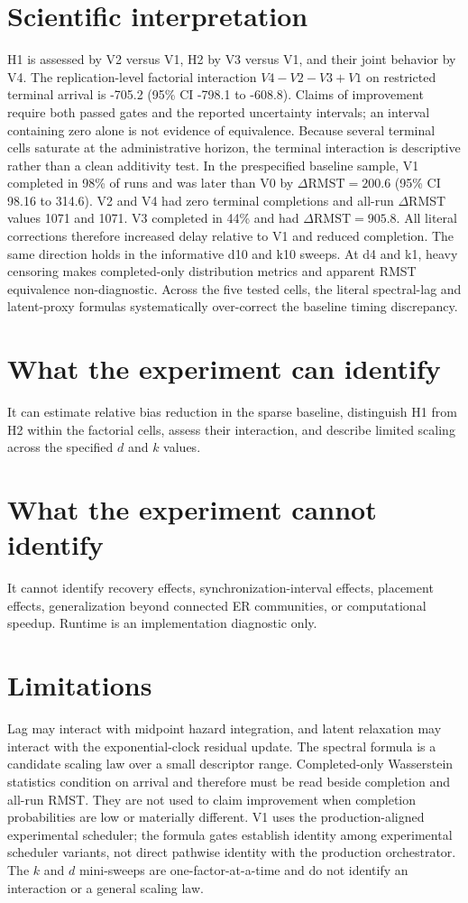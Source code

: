 \documentclass[11pt]{article}
\begin{document}
\section{Scientific interpretation}
H1 is assessed by V2 versus V1, H2 by V3 versus V1, and their joint behavior by
V4. The replication-level factorial interaction $V4-V2-V3+V1$ on restricted
terminal arrival is -705.2 (95\% CI -798.1 to -608.8). Claims of improvement require both passed
gates and the reported uncertainty intervals; an interval containing zero alone
is not evidence of equivalence. Because several terminal cells saturate at the
administrative horizon, the terminal interaction is descriptive rather than a
clean additivity test. In the prespecified baseline sample, V1 completed in 98\% of runs and was later than V0 by $\Delta\mathrm{RMST}=200.6$ (95\% CI 98.16 to 314.6). V2 and V4 had zero terminal completions and all-run $\Delta$RMST values 1071 and 1071. V3 completed in 44\% and had $\Delta\mathrm{RMST}=905.8$. All literal corrections therefore increased delay relative to V1 and reduced completion. The same direction holds in the informative d10 and k10 sweeps. At d4 and k1, heavy censoring makes completed-only distribution metrics and apparent RMST equivalence non-diagnostic. Across the five tested cells, the literal spectral-lag and latent-proxy formulas systematically over-correct the baseline timing discrepancy.

\section{What the experiment can identify}
It can estimate relative bias reduction in the sparse baseline, distinguish H1
from H2 within the factorial cells, assess their interaction, and describe limited
scaling across the specified $d$ and $k$ values.

\section{What the experiment cannot identify}
It cannot identify recovery effects, synchronization-interval effects, placement
effects, generalization beyond connected ER communities, or computational speedup.
Runtime is an implementation diagnostic only.

\section{Limitations}
Lag may interact with midpoint hazard integration, and latent relaxation may
interact with the exponential-clock residual update. The spectral formula is a
candidate scaling law over a small descriptor range. Completed-only Wasserstein
statistics condition on arrival and therefore must be read beside completion and
all-run RMST. They are not used to claim improvement when completion probabilities
are low or materially different. V1 uses the production-aligned experimental
scheduler; the formula gates establish identity among experimental scheduler
variants, not direct pathwise identity with the production orchestrator. The $k$
and $d$ mini-sweeps are one-factor-at-a-time and do not identify an interaction or
a general scaling law.
\end{document}
